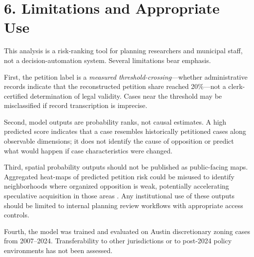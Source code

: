 \section*{6. Limitations and Appropriate Use}

This analysis is a risk-ranking tool for planning researchers and municipal staff, not a decision-automation system. Several limitations bear emphasis.

First, the petition label is a \emph{measured threshold-crossing}---whether administrative records indicate that the reconstructed petition share reached 20\%---not a clerk-certified determination of legal validity. Cases near the threshold may be misclassified if record transcription is imprecise.

Second, model outputs are probability ranks, not causal estimates. A high predicted score indicates that a case resembles historically petitioned cases along observable dimensions; it does not identify the cause of opposition or predict what would happen if case characteristics were changed.

Third, spatial probability outputs should not be published as public-facing maps. Aggregated heat-maps of predicted petition risk could be misused to identify neighborhoods where organized opposition is weak, potentially accelerating speculative acquisition in those areas \cite{barocas2016}. Any institutional use of these outputs should be limited to internal planning review workflows with appropriate access controls.

Fourth, the model was trained and evaluated on Austin discretionary zoning cases from 2007--2024. Transferability to other jurisdictions or to post-2024 policy environments has not been assessed.

